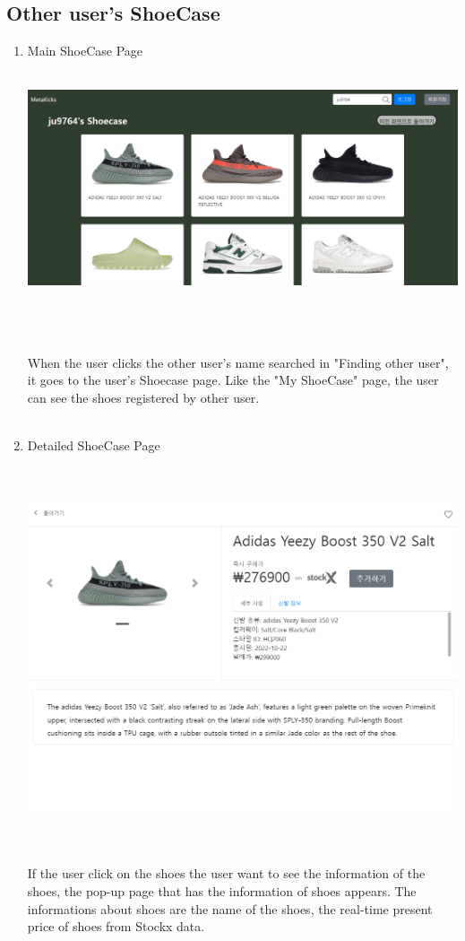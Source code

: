 \documentclass[conference]{IEEEtran}
\begin{document}
\subsection{Other user's ShoeCase}
\begin{enumerate}
	\item Main ShoeCase Page\\
\\\centerline{\includegraphics[scale=0.19]{pics/user_shoecase.png}}\\\\
\\When the user clicks the other user's name searched in "Finding other user", it goes to the user's Shoecase page. Like the "My ShoeCase" page, the user can see the shoes registered by other user.\\\\

	\item Detailed ShoeCase Page\\
\\\\\centerline{\includegraphics[scale=0.35]{pics/user_shoe_detail.png}}\\
\\If the user click on the shoes the user want to see the information of the shoes, the pop-up page that has the information of shoes appears. The informations about shoes are the name of the shoes, the real-time present price of shoes from Stockx data.\\
\end{enumerate}
\end{document}
